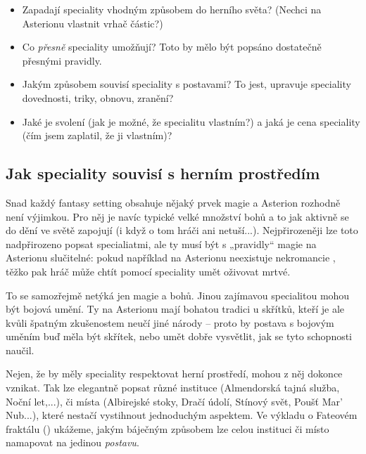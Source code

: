 \documentclass[../main.tex]{subfiles}
\begin{document}
\begin{itemize}
  \item Zapadají speciality vhodným způsobem do herního světa? (Nechci na Asterionu
    vlastnit vrhač částic?)
  \item Co \textit{přesně} speciality umožňují? Toto by mělo být popsáno dostatečně
    přesnými pravidly. 
  \item Jakým způsobem souvisí speciality s postavami? To jest, upravuje speciality
    dovednosti, triky, obnovu, zranění?
  \item Jaké je svolení (jak je možné, že specialitu vlastním?) a jaká je cena speciality
    (čím jsem zaplatil, že ji vlastním)?
\end{itemize}

\subsection{Jak speciality souvisí s herním prostředím}
\label{sec:spec-prvky}

Snad každý fantasy setting obsahuje nějaký prvek magie a Asterion rozhodně není výjimkou.
Pro něj je navíc typické velké množství bohů a to jak aktivně se do dění ve světě
zapojují (i když o tom hráči ani netuší...). Nejpřirozeněji lze toto nadpřirozeno popsat
specialiatmi, ale ty musí být s „pravidly“ magie na Asterionu slučitelné: pokud
například na Asterionu neexistuje nekromancie , těžko pak hráč může chtít pomocí speciality
umět oživovat mrtvé.

To se samozřejmě netýká jen magie a bohů. Jinou zajímavou specialitou mohou být bojová
umění. Ty na Asterionu mají bohatou tradici u skřítků, kteří je ale kvůli špatným
zkušenostem neučí jiné národy – proto by postava s bojovým uměním buď měla být skřítek,
nebo umět dobře vysvětlit, jak se tyto schopnosti naučil.

Nejen, že by měly speciality respektovat herní prostředí, mohou z něj dokonce vznikat.
Tak lze elegantně popsat různé instituce (Almendorská tajná služba, Noční let,...), či
místa (Albirejské stoky, Dračí údolí, Stínový svět, Poušť Mar' Nub...), které nestačí
vystihnout jednoduchým aspektem. Ve výkladu o Fateovém fraktálu ()
ukážeme, jakým báječným způsobem lze celou instituci či místo namapovat na jedinou \textit{postavu}.
\end{document}
